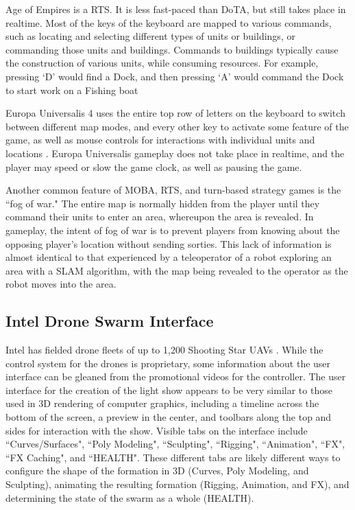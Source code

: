 Age of Empires is a RTS. 
It is less fast-paced than DoTA, but still takes place in realtime. 
Most of the keys of the keyboard are mapped to various commands, such as locating and selecting different types of units or buildings, or commanding those units and buildings. 
Commands to buildings typically cause the construction of various units, while consuming resources. 
For example, pressing `D' would find a Dock, and then pressing `A' would command the Dock to start work on a Fishing boat \citep{AOEControls}

Europa Universalis 4 uses the entire top row of letters on the keyboard to switch between different map modes, and every other key to activate some feature of the game, as well as mouse controls for interactions with individual units and locations \citep{EUControls}. 
Europa Universalis gameplay does not take place in realtime, and the player may speed or slow the game clock, as well as pausing the game. 

Another common feature of MOBA, RTS, and turn-based strategy games is the ``fog of war."
The entire map is normally hidden from the player until they command their units to enter an area, whereupon the area is revealed. 
In gameplay, the intent of fog of war is to prevent players from knowing about the opposing player's location without sending sorties. 
This lack of information is almost identical to that experienced by a teleoperator of a robot exploring an area with a SLAM algorithm, with the map being revealed to the operator as the robot moves into the area. 

\subsection{Intel Drone Swarm Interface} \label{section:Intel_Drone_Swarm_Interface}

Intel has fielded drone fleets of up to 1,200 Shooting Star UAVs \citep{IntelDronesPage}. 
While the control system for the drones is proprietary, some information about the user interface can be gleaned from the promotional videos for the controller. 
The user interface for the creation of the light show appears to be very similar to those used in 3D rendering of computer graphics, including a timeline across the bottom of the screen, a preview in the center, and toolbars along the top and sides for interaction with the show. 
Visible tabs on the interface include ``Curves/Surfaces", ``Poly Modeling", ``Sculpting", ``Rigging", ``Animation", ``FX", ``FX Caching", and ``HEALTH". 
These different tabs are likely different ways to configure the shape of the formation in 3D (Curves, Poly Modeling, and Sculpting), animating the resulting formation (Rigging, Animation, and FX), and determining the state of the swarm as a whole (HEALTH). 

